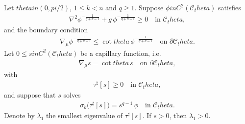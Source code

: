 \documentclass[12pt]{amsart}
\def\theta{theta}%
\def\pi{pi}%
\def\in{in }%
\numberwithin{equation}{section}
\newcommand{\8}{\infty}
\newcommand{\cC}{\mathcal{C}}
\newcommand{\eq}[1]{\begin{equation}\begin{alignedat}{2}#1\end{alignedat}\end{equation}}
\newcommand{\Cth}{\cC_\theta}
\begin{document}
\begin{thm}\label{thm:full-rank-p}
Let $\theta\in(0,\pi/2)$, $1\le k<n$ and $q\geq 1$.
Suppose $\phi\in C^2(\Cth)$ satisfies
\eq{\label{eq:phi-structure}
\nabla^2\phi^{-\frac{1}{q+k-1}} + g\,\phi^{-\frac{1}{q+k-1}} \ge 0
  \quad\text{in }\Cth,
}
and the boundary condition
\eq{\label{eq:phi-bdry-p}
\nabla_\mu\phi^{-\frac{1}{q+k-1}} \le \cot\theta \,\phi^{-\frac{1}{q+k-1}}
  \quad\text{on }\partial \Cth.
}
Let $0\le s\in C^2(\Cth)$ be a capillary function, i.e.
\eq{\label{eq:s-capillary}
\nabla_\mu s = \cot\theta\,s
  \quad\text{on }\partial \Cth,
}
with
\eq{
\tau^\sharp[s]\ge 0\quad\text{in }\Cth,
}
and suppose that $s$ solves
\eq{\label{eq:sigma-k-p}
  \sigma_k\bigl(\tau^\sharp[s]\bigr) = s^{q-1}\,\phi
  \quad\text{in }\cC_\theta.
}
Denote by $\lambda_1$ the smallest eigenvalue of $\tau^\sharp[s]$. If $s>0$, then
$
  \lambda_1 > 0.
$
\end{thm}
\end{document}

